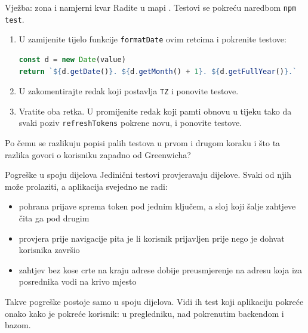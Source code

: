 \begin{frame}[fragile]{Vježba: zona i namjerni kvar}
Radite u mapi . Testovi se pokreću naredbom \texttt{npm test}.

\vspace{0.4em}
\begin{enumerate}
  \itemsep0.3em
  \item U  zamijenite tijelo funkcije \texttt{formatDate} ovim retcima i pokrenite testove:
\begin{lstlisting}[language=typescript]
const d = new Date(value)
return `${d.getDate()}. ${d.getMonth() + 1}. ${d.getFullYear()}.`
\end{lstlisting}
  \item U  zakomentirajte redak koji postavlja \texttt{TZ} i ponovite testove.
  \item Vratite oba retka. U  promijenite redak koji pamti obnovu u tijeku tako da svaki poziv \texttt{refreshTokens} pokrene novu, i ponovite testove.
\end{enumerate}

\vspace{0.4em}
Po čemu se razlikuju popisi palih testova u prvom i drugom koraku i što ta razlika govori o korisniku zapadno od Greenwicha?
\end{frame}


\begin{frame}{Pogreške u spoju dijelova}
Jedinični testovi provjeravaju dijelove. Svaki od njih može prolaziti, a aplikacija svejedno ne radi:

\vspace{0.6em}
\begin{itemize}
  \itemsep0.45em
  \item pohrana prijave sprema token pod jednim ključem, a sloj koji šalje zahtjeve čita ga pod drugim
  \item provjera prije navigacije pita je li korisnik prijavljen prije nego je dohvat korisnika završio
  \item zahtjev bez kose crte na kraju adrese dobije preusmjerenje na adresu koja iza posrednika vodi na krivo mjesto
\end{itemize}

\vspace{0.6em}
Takve pogreške postoje samo u spoju dijelova. Vidi ih test koji aplikaciju pokreće onako kako je pokreće korisnik: u pregledniku, nad pokrenutim backendom i bazom.
\end{frame}

